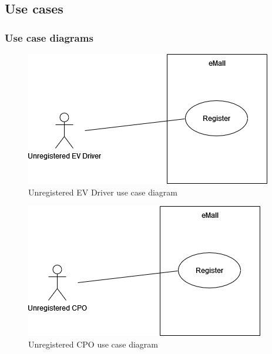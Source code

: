 \subsection{Use cases}

\subsubsection{Use case diagrams}

\vspace*{3cm}
\begin{figure}[H]
    \centering
    \includegraphics[scale=0.6]{src/use_case_diagram/driver_registration.png}
    \caption{Unregistered EV Driver use case diagram}
\end{figure}
\vspace*{3cm}
\begin{figure}[H]
    \centering
    \includegraphics[scale=0.6]{src/use_case_diagram/cpo_registration.png}
    \caption{Unregistered CPO use case diagram}
\end{figure}

